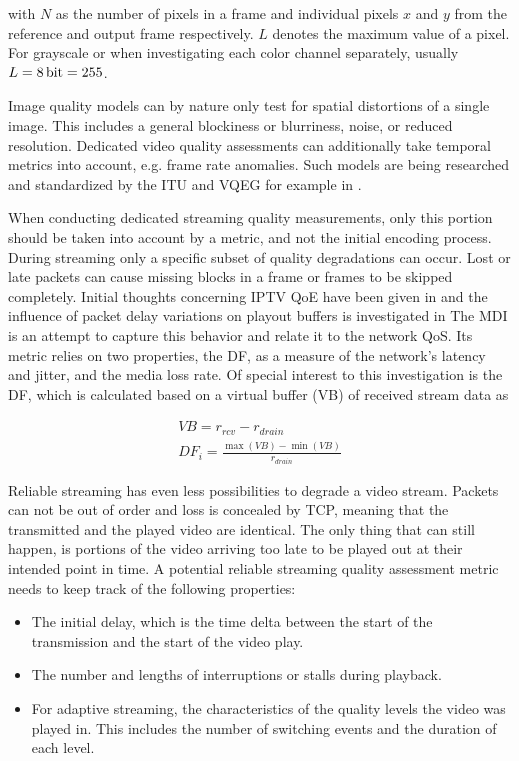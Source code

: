 with $N$ as the number of pixels in a frame and individual pixels $x$ and $y$ from the reference and output frame respectively. $L$ denotes the maximum value of a pixel. For grayscale or when investigating each color channel separately, usually $L = \SI{8}{\bit} = 255$.  \cite{objective-vqa}

Image quality models can by nature only test for spatial distortions of a single image. This includes a general blockiness or blurriness, noise, or reduced resolution. Dedicated video quality assessments can additionally take temporal metrics into account, e.g. frame rate anomalies. Such models are being researched and standardized by the \gls{ITU} and \gls{VQEG} for example in \cite{ituJ144, ituJ246, ituJ247}.


When conducting dedicated streaming quality measurements, only this portion should be taken into account by a metric, and not the initial encoding process. During streaming only a specific subset of quality degradations can occur. Lost or late packets can cause missing blocks in a frame or frames to be skipped completely. Initial thoughts concerning \gls{IPTV} \gls{QoE} have been given in \cite{ituG1080} and the influence of packet delay variations on playout buffers is investigated in \cite{rfc3393}The \gls{MDI} \cite{rfc4445} is an attempt to capture this behavior and relate it to the network \gls{QoS}. Its metric relies on two properties, the \gls{DF}, as a measure of the network's latency and jitter, and the media loss rate. Of special interest to this investigation is the \gls{DF}, which is calculated based on a virtual buffer (VB) of received stream data as

\begin{equation}
    \begin{aligned}
        VB = r_{rcv} - r_{drain} \\
        DF_i = \frac{\max(VB) - \min(VB)}{r_{drain}}
    \end{aligned}
\end{equation}
 
Reliable streaming has even less possibilities to degrade a video stream. Packets can not be out of order and loss is concealed by \gls{TCP}, meaning that the transmitted and the played video are identical. The only thing that can still happen, is portions of the video arriving too late to be played out at their intended point in time.
A potential reliable streaming quality assessment metric needs to keep track of the following properties:

\begin{itemize}
    \item The initial delay, which is the time delta between the start of the transmission and the start of the video play.
    \item The number and lengths of interruptions or stalls during playback.
    \item For adaptive streaming, the characteristics of the quality levels the video was played in. This includes the number of switching events and the duration of each level.
\end{itemize}

